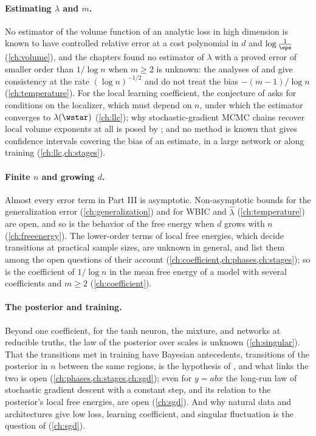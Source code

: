 \begin{refsection}
\paragraph{Estimating $\lambda$ and $m$.} No estimator of the volume function of an analytic loss in high dimension is known to have controlled relative error at a cost polynomial in $d$ and $\log\frac1\eps$ (\cref{ch:volume}), and the chapters found no estimator of $\lambda$ with a proved error of smaller order than $1/\log n$ when $m\ge2$ is unknown: the analyses of \textcite{Imai2019a} and \textcite{TakioSuzuki2025} give consistency at the rate $(\log n)^{-1/2}$ and do not treat the bias $-(m-1)/\log n$ (\cref{ch:temperature}). For the local learning coefficient, the conjecture of \textcite[Appendix~D]{LauEtAl2025} asks for conditions on the localizer, which must depend on $n$, under which the estimator converges to $\lambda(\wstar)$ (\cref{ch:llc}); why stochastic-gradient MCMC chains recover local volume exponents at all is posed by \textcite{HitchcockHoogland2025}; and no method is known that gives confidence intervals covering the bias of an estimate, in a large network or along training (\cref{ch:llc,ch:stages}).

\paragraph{Finite $n$ and growing $d$.} Almost every error term in Part III is asymptotic. Non-asymptotic bounds for the generalization error (\cref{ch:generalization}) and for WBIC and $\hat\lambda$ (\cref{ch:temperature}) are open, and so is the behavior of the free energy when $d$ grows with $n$ (\cref{ch:freeenergy}). The lower-order terms of local free energies, which decide transitions at practical sample sizes, are unknown in general, and \textcite{CarrollEtAl2025} list them among the open questions of their account (\cref{ch:coefficient,ch:phases,ch:stages}); so is the coefficient of $1/\log n$ in the mean free energy of a model with several coefficients and $m\ge2$ (\cref{ch:coefficient}).

\paragraph{The posterior and training.} Beyond one coefficient, for the tanh neuron, the mixture, and networks at reducible truths, the law of the posterior over scales is unknown (\cref{ch:singular}). That the transitions met in training have Bayesian antecedents, transitions of the posterior in $n$ between the same regions, is the hypothesis of \textcite{ChenEtAl2023}, and what links the two is open (\cref{ch:phases,ch:stages,ch:sgd}); even for $y=abx$ the long-run law of stochastic gradient descent with a constant step, and its relation to the posterior's local free energies, are open (\cref{ch:sgd}). And why natural data and architectures give low loss, learning coefficient, and singular fluctuation is the question of \textcite{Murfet2023a} (\cref{ch:sgd}).


\end{refsection}
